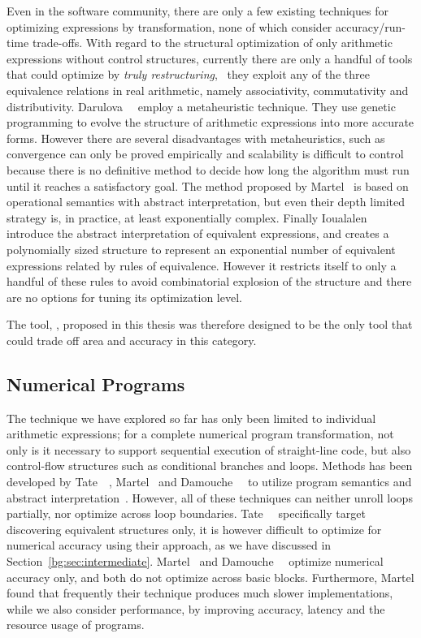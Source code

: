 Even in the software community, there are only a few existing techniques
for optimizing expressions by transformation, none of which consider
accuracy/run-time trade-offs.  With regard to the structural optimization
of only arithmetic expressions without control structures, currently
there are only a handful of tools that could optimize by \emph{truly
restructuring}, \ie~they exploit any of the three equivalence relations in
real arithmetic, namely associativity, commutativity and distributivity.
Darulova~\etal~\cite{darulova} employ a metaheuristic technique. They use
genetic programming to evolve the structure of arithmetic expressions into more
accurate forms. However there are several disadvantages with metaheuristics,
such as convergence can only be proved empirically and scalability is difficult
to control because there is no definitive method to decide how long the
algorithm must run until it reaches a satisfactory goal. The method proposed
by Martel~\cite{martel07} is based on operational semantics with abstract
interpretation, but even their depth limited strategy is, in practice, at least
exponentially complex.  Finally Ioualalen~\etal~\cite{ioualalen} introduce the
abstract interpretation of equivalent expressions, and creates a polynomially
sized structure to represent an exponential number of equivalent expressions
related by rules of equivalence. However it restricts itself to only a handful
of these rules to avoid combinatorial explosion of the structure and there are
no options for tuning its optimization level.


 The tool, \soap{}, proposed in this thesis was therefore
designed to be the only tool that could trade off area and accuracy in this
category.


\subsection{Numerical Programs}
\label{bg:sub:numerical_programs}

The technique we have explored so far has only been limited to individual
arithmetic expressions; for a complete numerical program transformation, not
only is it necessary to support sequential execution of straight-line code,
but also control-flow structures such as conditional branches and loops.
Methods has been developed by Tate~\etal~\cite{tate09}, Martel~\cite{martel09}
and Damouche~\etal~\cite{damouche15} to utilize program semantics and
abstract interpretation~\cite{cousot77}.  However, all of these techniques
can neither unroll loops partially, nor optimize across loop boundaries.
Tate~\etal~\cite{tate09} specifically target discovering equivalent structures
only, it is however difficult to optimize for numerical accuracy using
their approach, as we have discussed in Section~\ref{bg:sec:intermediate}.
Martel~\cite{martel09} and Damouche~\etal~\cite{damouche15} optimize
numerical accuracy only, and both do not optimize across basic blocks.
Furthermore, Martel found that frequently their technique produces much slower
implementations,  while we also consider performance, by
improving accuracy, latency and the resource usage of programs.
